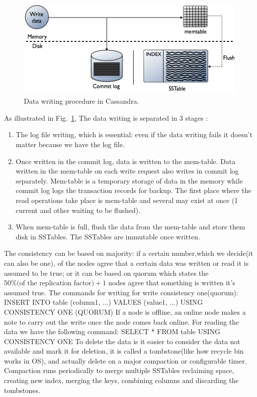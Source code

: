 \documentclass[a4page, 11pt]{article}
\begin{document}
\begin{figure}[h] %
\centering
\includegraphics[width=100 mm]{cassandrawrite.png}
\caption{\label{cassandrawrite:fig} Data writing procedure in Cassandra.}
\end{figure}
As illustrated in Fig.~\ref{cassandrawrite:fig}, The data writing is separated in 3 stages : 
\begin{enumerate}
	\item The log file writing, which is essential: even if the data writing fails it doesn't matter because we have the log file.
	\item Once written in the commit log, data is written to the mem-table. Data written in the mem-table on each write request also writes in commit log separately. Mem-table is a temporary storage of data in the memory while commit log logs the transaction records for backup.
	\newline The first place where the read operations take place is mem-table and several may exist at once (1 current and other waiting to be flushed). 
	\item When mem-table is full, flush the data from the mem-table and store them disk in SSTables. The SSTables are immutable once written.
\end{enumerate}
The consistency can be based on majority: if a certain number,which we decide(it can also be one), of the nodes agree that a certain data was written or read it is assumed to be true; \newline
or it can be based on quorum which states the $50\%\text{(of the replication factor)}+1$ nodes agree that something is written it's assumed true.
\newline
The commands for writing for write consistency one(quorum): \newline
INSERT INTO table (column1, ...) VALUES (value1, ...) USING CONSISTENCY ONE (QUORUM)\newline
If a node is offline, an online node makes a note to carry out the write once the node comes back online.
For reading the data we have the following command:
SELECT * FROM table USING CONSISTENCY ONE
\newline
To delete the data is it easier to consider the data not available and mark it for deletion, it is called a tombstone(like how recycle bin works in OS), and actually delete on a major compaction or configurable timer.\newline
Compaction runs periodically to merge multiple SSTables reclaiming space, creating new index, merging the keys, combining columns and discarding the tombstones.
\end{document}
